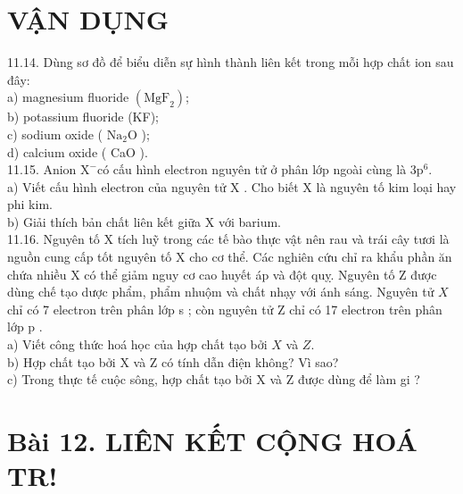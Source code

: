 \documentclass[10pt]{article}
\begin{document}
\section*{VẬN DỤNG}
11.14. Dùng sơ đồ để biểu diễn sự hình thành liên kết trong mỗi hợp chất ion sau đây:\\
a) magnesium fluoride $\left(\mathrm{MgF}_{2}\right)$;\\
b) potassium fluoride (KF);\\
c) sodium oxide ( $\mathrm{Na}_{2} \mathrm{O}$ );\\
d) calcium oxide ( CaO ).\\
11.15. Anion $\mathrm{X}^{-}$có cấu hình electron nguyên tử ở phân lớp ngoài cùng là $3 \mathrm{p}^{6}$.\\
a) Viết cấu hình electron của nguyên tử X . Cho biết X là nguyên tố kim loại hay phi kim.\\
b) Giải thích bản chất liên kết giữa X với barium.\\
11.16. Nguyên tố X tích luỹ trong các tế bào thực vật nên rau và trái cây tươi là nguồn cung cấp tốt nguyên tố X cho cơ thể. Các nghiên cứu chỉ ra khẩu phần ăn chứa nhiều X có thể giảm nguy cơ cao huyết áp và đột quỵ. Nguyên tố Z được dùng chế tạo dược phẩm, phẩm nhuộm và chất nhạy với ánh sáng. Nguyên tử $X$ chỉ có 7 electron trên phân lớp s ; còn nguyên tử Z chỉ có 17 electron trên phân lớp p .\\
a) Viết công thức hoá học của hợp chất tạo bởi $X$ và $Z$.\\
b) Hợp chất tạo bởi X và Z có tính dẫn điện không? Vì sao?\\
c) Trong thực tế cuộc sông, hợp chất tạo bởi X và Z được dùng để làm gi ?

\section*{Bài 12. LIÊN KẾT CỘNG HOÁ TR!}
\end{document}

